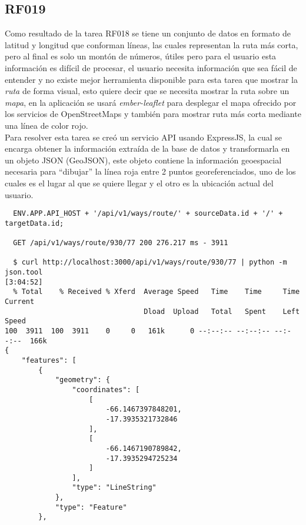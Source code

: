 \subsection{RF019}
\label{sub:RF019}
Como resultado de la tarea RF018 se tiene un conjunto de datos en formato de latitud y longitud que conforman líneas, las cuales representan la ruta más corta, pero al final es solo un montón de números, útiles pero para el usuario esta información es difícil de procesar, el usuario necesita información que sea fácil de entender y no existe mejor herramienta disponible para esta tarea que mostrar la \emph{ruta} de forma visual, esto quiere decir que se necesita mostrar la ruta sobre un \emph{mapa}, en la aplicación se usará \emph{ember-leaflet} para desplegar el mapa ofrecido por los servicios de OpenStreetMaps y también para mostrar ruta más corta mediante una línea de color rojo.\\

Para resolver esta tarea se creó un servicio API usando ExpressJS, la cual se encarga obtener la información extraída de la base de datos y transformarla en un objeto JSON (GeoJSON), este objeto contiene la información geoespacial necesaria para ``dibujar'' la línea roja entre 2 puntos georeferenciados, uno de los cuales es el lugar al que se quiere llegar y el otro es la ubicación actual del usuario. \\

\begin{verbatim}
  ENV.APP.API_HOST + '/api/v1/ways/route/' + sourceData.id + '/' + targetData.id;

  GET /api/v1/ways/route/930/77 200 276.217 ms - 3911

  $ curl http://localhost:3000/api/v1/ways/route/930/77 | python -m json.tool                                                       [3:04:52]
  % Total    % Received % Xferd  Average Speed   Time    Time     Time  Current
                                 Dload  Upload   Total   Spent    Left  Speed
100  3911  100  3911    0     0   161k      0 --:--:-- --:--:-- --:--:--  166k
{
    "features": [
        {
            "geometry": {
                "coordinates": [
                    [
                        -66.1467397848201,
                        -17.3935321732846
                    ],
                    [
                        -66.1467190789842,
                        -17.3935294725234
                    ]
                ],
                "type": "LineString"
            },
            "type": "Feature"
        },

\end{verbatim}

